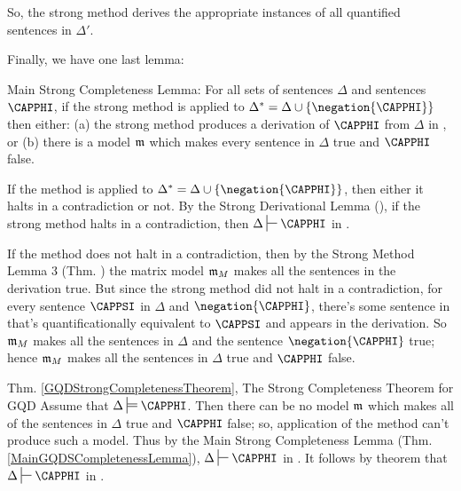 \begin{PROOF}
\noindent{}So, the strong method derives the appropriate instances of all quantified sentences in $\Delta'$.

\end{PROOF}
\noindent{}Finally, we have one last lemma:
\begin{THEOREM}{ Main Strong \GQD{} Completeness Lemma:}
For all sets of \GQL{} sentences $\Delta$ and \GQL{} sentences $\CAPPHI$, if the strong method is applied to $\Delta^*=\Delta\cup\{\negation{\CAPPHI}\}$ then either: (a) the strong method produces a derivation of $\CAPPHI$ from $\Delta$ in \GQDP{}, or (b) there is a model $\mathfrak{m}$ which makes every sentence in $\Delta$ true and $\CAPPHI$ false.
\end{THEOREM}
\begin{PROOF}
If the method is applied to $\Delta^*=\Delta\cup\{\negation{\CAPPHI}\}$, then either it halts in a contradiction or not. 
By the Strong Derivational Lemma (), if the strong method halts in a contradiction, then $\Delta\sststile{}{}\CAPPHI$ in \GQDP{}.

If the method does not halt in a contradiction, then by the Strong Method Lemma 3 (Thm. ) the matrix model $\mathfrak{m}_M$  makes all the sentences in the derivation true. 
But since the strong method did not halt in a contradiction, for every sentence $\CAPPSI$ in $\Delta$ and $\negation{\CAPPHI}$, there's some sentence in  that's quantificationally equivalent to $\CAPPSI$ and appears in the derivation. 
So $\mathfrak{m}_M$ makes all the sentences in $\Delta$ and the sentence $\negation{\CAPPHI}$ true; 
hence $\mathfrak{m}_M$ makes all the sentences in $\Delta$ true and $\CAPPHI$ false. 
\end{PROOF}
\begin{PROOFOF}{Thm. \ref{GQDStrongCompletenessTheorem}, The Strong Completeness Theorem for GQD}
Assume that $\Delta\sdtstile{}{}\CAPPHI$. 
Then there can be no model $\mathfrak{m}$ which makes all of the sentences in $\Delta$ true and $\CAPPHI$ false;
so, application of the method can't produce such a model.
Thus by the Main \GQD{} Strong Completeness Lemma (Thm. \ref{MainGQDSCompletenessLemma}), $\Delta\sststile{}{}\CAPPHI$ in \GQDP{}. 
It follows by theorem  that $\Delta\sststile{}{}\CAPPHI$ in \GQD{}.
\end{PROOFOF}

